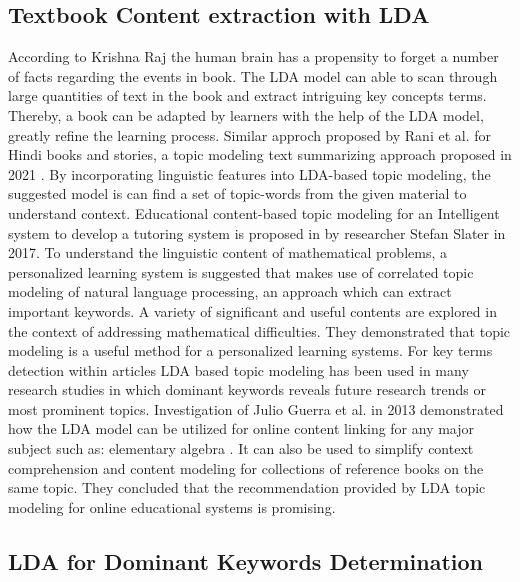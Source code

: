 \documentclass[sn-mathphys,Numbered]{sn-jnl}%
\theoremstyle{thmstyleone}%
\theoremstyle{thmstyletwo}%
\theoremstyle{thmstylethree}%
\begin{document}
\subsection{Textbook Content extraction with LDA}\label{Text_content_lda}
According to Krishna Raj \cite{raj_p_m_sentiment_2022} the human brain has a propensity to forget a number of facts regarding the events in book. The LDA model can able to scan through large quantities of text in the book and extract intriguing key concepts terms. Thereby, a book can be adapted by learners with the help of the LDA model, greatly refine the learning process. Similar approch proposed by  Rani et al. for Hindi books and stories, a topic modeling text summarizing approach proposed in 2021 \cite{rani_extractive_2021}. By incorporating linguistic features into LDA-based topic modeling, the suggested model is can find a set of topic-words from the given material to understand context.  Educational content-based topic modeling for an Intelligent system to develop a tutoring system is proposed in \cite{slater_using_2017} by researcher Stefan Slater in 2017. To understand the linguistic content of mathematical problems, a personalized learning system is suggested that makes use of correlated topic modeling of natural language processing, an approach which can extract important keywords. A variety of significant and useful contents are explored in the context of addressing mathematical difficulties. They demonstrated that topic modeling is a useful method for a personalized learning systems. For key terms detection within articles LDA based topic modeling has been used in many research studies in which dominant keywords reveals future research trends or most prominent topics. Investigation of Julio Guerra et al. in 2013 demonstrated how the LDA model can be utilized for online content linking for any major subject such as: elementary algebra \cite{guerra_when_2013}. It can also be used to simplify context comprehension and content modeling for collections of reference books on the same topic. They concluded that the recommendation provided by LDA topic modeling for online educational systems is promising.

\subsection{LDA for Dominant Keywords Determination}\label{dom_lda}
\end{document}

